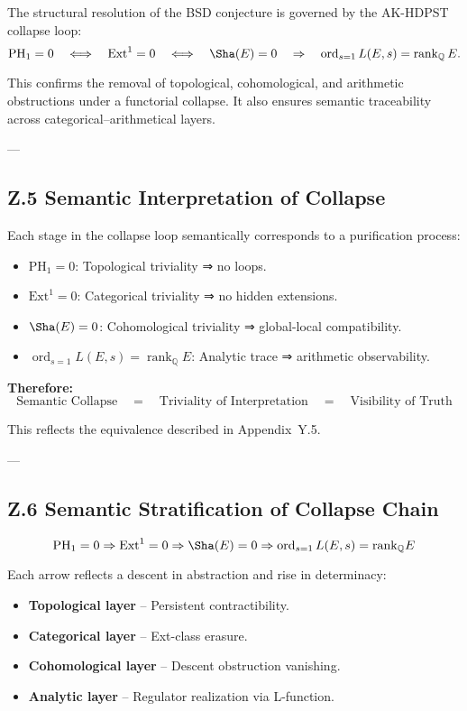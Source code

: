 The structural resolution of the BSD conjecture is governed by the AK-HDPST collapse loop:
\[
\mathrm{PH}_1 = 0 
\quad \Longleftrightarrow \quad \mathrm{Ext}^1 = 0 
\quad \Longleftrightarrow \quad \Sha(E) = 0 
\quad \Rightarrow \quad \operatorname{ord}_{s=1} L(E,s) = \operatorname{rank}_\mathbb{Q} E.
\]

This confirms the removal of topological, cohomological, and arithmetic obstructions under a functorial collapse.  
It also ensures semantic traceability across categorical–arithmetical layers.

---

\subsection*{Z.5 Semantic Interpretation of Collapse}

Each stage in the collapse loop semantically corresponds to a purification process:

\begin{itemize}
  \item \( \mathrm{PH}_1 = 0 \): Topological triviality ⇒ no loops.
  \item \( \mathrm{Ext}^1 = 0 \): Categorical triviality ⇒ no hidden extensions.
  \item \( \Sha(E) = 0 \): Cohomological triviality ⇒ global-local compatibility.
  \item \( \operatorname{ord}_{s=1} L(E,s) = \operatorname{rank}_\mathbb{Q} E \): Analytic trace ⇒ arithmetic observability.
\end{itemize}

\textbf{Therefore:}
\[
\text{Semantic Collapse} \quad = \quad \text{Triviality of Interpretation} \quad = \quad \text{Visibility of Truth}
\]

This reflects the equivalence described in Appendix~Y.5.

---

\subsection*{Z.6 Semantic Stratification of Collapse Chain}

\[
\mathrm{PH}_1 = 0 \Rightarrow \mathrm{Ext}^1 = 0 \Rightarrow \Sha(E) = 0 \Rightarrow \operatorname{ord}_{s=1} L(E,s) = \mathrm{rank}_\mathbb{Q} E
\]

Each arrow reflects a descent in abstraction and rise in determinacy:

\begin{itemize}
  \item \textbf{Topological layer} – Persistent contractibility.
  \item \textbf{Categorical layer} – Ext-class erasure.
  \item \textbf{Cohomological layer} – Descent obstruction vanishing.
  \item \textbf{Analytic layer} – Regulator realization via L-function.
\end{itemize}


